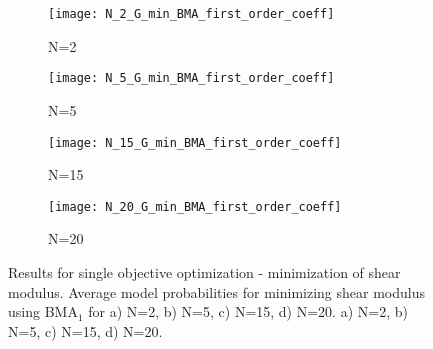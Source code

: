 \documentclass[preprint,amsmath,amssymb,aps, prb,showkeys]{revtex4-1}
\begin{document}
\begin{figure}[htp]
        \parbox{.975\textwidth}{
            \begin{subfigure}{.475\linewidth}
                \texttt{[image: N\_2\_G\_min\_BMA\_first\_order\_coeff]}
                \caption{N=2}
                \label{fig:G_min_fo_coeff_N_2_BMA}
        \end{subfigure}
            \begin{subfigure}{.475\linewidth}
                \texttt{[image: N\_5\_G\_min\_BMA\_first\_order\_coeff]}
                \caption{N=5}
                \label{fig:G_min_fo_coeff_N_5_BMA}
        \end{subfigure}
            \begin{subfigure}{.475\linewidth}
                \texttt{[image: N\_15\_G\_min\_BMA\_first\_order\_coeff]}
                \caption{N=15}
                \label{fig:G_min_fo_coeff_N_15_BMA}
        \end{subfigure}
            \begin{subfigure}{.475\linewidth}
                \texttt{[image: N\_20\_G\_min\_BMA\_first\_order\_coeff]}
                \caption{N=20}
                \label{fig:G_min_fo_coeff_N_20_BMA}
        \end{subfigure}
        }
        \caption{ Results for single objective optimization - minimization of shear modulus. Average model probabilities for minimizing shear modulus using BMA$_1$ for a) N=2, b) N=5, c) N=15, d) N=20. a) N=2, b) N=5, c) N=15, d) N=20.}
        \label{fig:G_min_fo_coeff_BMA}        
\end{figure} 
\end{document}
